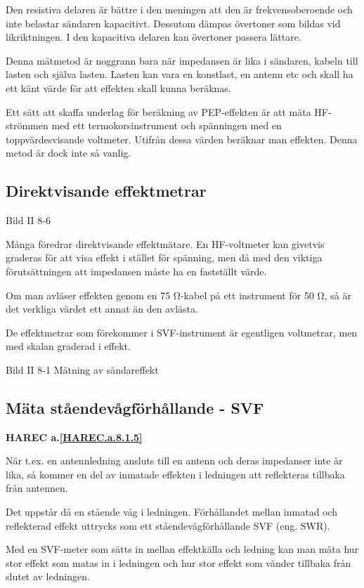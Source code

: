 Den resistiva delaren är bättre i den meningen att den är
frekvensoberoende och inte belastar sändaren kapacitivt. Dessutom
dämpas övertoner som bildas vid likriktningen. I den kapacitiva
delaren kan övertoner passera lättare.

Denna mätmetod är noggrann bara när impedansen är lika i sändaren,
kabeln till lasten och själva lasten. Lasten kan vara en konstlast, en
antenn etc och skall ha ett känt värde för att effekten skall kunna
beräknas.

Ett sätt att skaffa underlag för beräkning av PEP-effekten är att mäta
HF-strömmen med ett termokorsinstrument och spänningen med en
toppvärdesvisande voltmeter.  Utifrån dessa värden beräknar man
effekten. Denna metod är dock inte så vanlig.

\subsection{Direktvisande effektmetrar}

Bild II 8-6

Många föredrar direktvisande effektmätare.  En HF-voltmeter kan
givetvis graderas för att visa effekt i stället för spänning, men då
med den viktiga förutsättningen att impedansen måste ha en fastställt
värde.

Om man avläser effekten genom en 75 Ω-kabel på ett instrument för 50
Ω, så är det verkliga värdet ett annat än den avlästa.

De effektmetrar som förekommer i SVF-instrument är egentligen
voltmetrar, men med skalan graderad i effekt.

Bild II 8-1 Mätning av sändareffekt

\subsection{Mäta ståendevågförhållande - SVF}
\textbf{
HAREC a.\ref{HAREC.a.8.1.5}\label{myHAREC.a.8.1.5}
}

När t.ex. en antennledning ansluts till en antenn och deras impedanser
inte är lika, så kommer en del av inmatade effekten i ledningen att
reflekteras tillbaka från antennen.

Det uppstår då en stående våg i ledningen. Förhållandet mellan inmatad
och reflekterad effekt uttrycks som ett ståendevågförhållande SVF
(eng. SWR).

Med en SVF-meter som sätts in mellan effektkälla och ledning kan man
mäta hur stor effekt som matas in i ledningen och hur stor effekt som
vänder tillbaka från slutet av ledningen.

